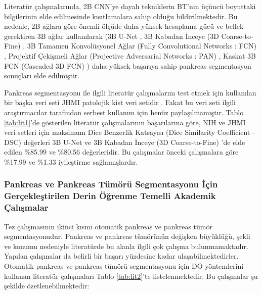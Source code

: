 Literatür çalışmalarında, 2B CNN’ye dayalı tekniklerin BT’nin üçüncü boyuttaki bilgilerinin elde edilmesinde kısıtlamalara sahip olduğu bildirilmektedir. Bu nedenle, 2B ağlara göre önemli ölçüde daha yüksek hesaplama gücü ve bellek gerektiren 3B ağlar kullanılarak (3B U-Net \cite{zhao2019fully}, 3B Kabadan İnceye (3D Coarse-to-Fine) \cite{zhu20183d,chen2019harnessing}, 3B Tamamen Konvolüsyonel Ağlar (Fully Convolutional Networks : FCN) \cite{roth2018application}, Projektif Çekişmeli Ağlar (Projective Adversarial Networks : PAN) \cite{khosravan2019pan}, Kaskat 3B FCN (Cascaded 3D FCN) \cite{xue2019cascaded}) daha yüksek başarıya sahip pankreas segmentasyon sonuçları elde edilmiştir. 

Pankreas segmentasyonu ile ilgili literatür çalışmalarını test etmek için kullanılan bir başka veri seti JHMI patolojik kist veri setidir \cite{zhu20183d,zhou2017deep}. Fakat bu veri seti ilgili araştırmacılar tarafından serbest kullanım için henüz paylaşılmamıştır. Tablo \ref{tab:lit1}’de gösterilen literatür çalışmalarının başarılarına göre, NIH ve JHMI veri setleri için maksimum Dice Benzerlik Katsayısı (Dice Similarity Coefficient - DSC) değerleri 3B U-Net \cite{roth2015deep, farag2016bottom} ve 3B Kabadan İnceye (3D Coarse-to-Fine) \cite{zhu20183d}'de elde edilen \%85.99 ve \%80.56 değerleridir. Bu çalışmalar önceki çalışmalara göre \%17.99 ve \%1.33 iyileştirme sağlamışlardır.

\subsubsection{Pankreas ve Pankreas Tümörü Segmentasyonu İçin Gerçekleştirilen Derin Öğrenme Temelli Akademik Çalışmalar}

Tez çalışmasının ikinci kısmı otomatik pankreas ve pankreas tümör segmentasyonudur. Pankreas ve pankreas tümörünün değişken büyüklüğü, şekli ve konumu nedeniyle literatürde bu alanla ilgili çok çalışma bulunmamaktadır. Yapılan çalışmalar da belirli bir başarı yüzdesine kadar ulaşabilmektedirler. Otomatik pankreas ve pankreas tümörü segmentasyonu için DÖ yöntemlerini kullanan literatür çalışmaları Tablo \ref{tab:lit2}’te listelenmektedir. Bu çalışmalar şu şekilde özetlenebilmektedir: 


